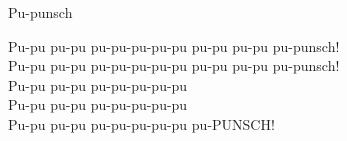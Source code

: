 \begin{song}{Pu-punsch}
	
	Pu-pu pu-pu pu-pu-pu-pu-pu pu-pu pu-pu pu-punsch!\\
	Pu-pu pu-pu pu-pu-pu-pu-pu pu-pu pu-pu pu-punsch!\\
	Pu-pu pu-pu pu-pu-pu-pu-pu\\
	Pu-pu pu-pu pu-pu-pu-pu-pu\\
	Pu-pu pu-pu pu-pu-pu-pu-pu pu-PUNSCH!
	
\end{song}

